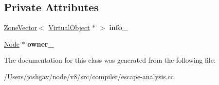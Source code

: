 \subsection*{Private Attributes}
\begin{DoxyCompactItemize}
\item 
\hyperlink{classv8_1_1internal_1_1_zone_vector}{Zone\+Vector}$<$ \hyperlink{classv8_1_1internal_1_1compiler_1_1_virtual_object}{Virtual\+Object} $\ast$ $>$ {\bfseries info\+\_\+}\hypertarget{classv8_1_1internal_1_1compiler_1_1_virtual_state_a58dbd58f14932ccfd8983ab15384cf06}{}\label{classv8_1_1internal_1_1compiler_1_1_virtual_state_a58dbd58f14932ccfd8983ab15384cf06}

\item 
\hyperlink{classv8_1_1internal_1_1compiler_1_1_node}{Node} $\ast$ {\bfseries owner\+\_\+}\hypertarget{classv8_1_1internal_1_1compiler_1_1_virtual_state_abf3ccce504cec6b913ee3abd6ce9ee76}{}\label{classv8_1_1internal_1_1compiler_1_1_virtual_state_abf3ccce504cec6b913ee3abd6ce9ee76}

\end{DoxyCompactItemize}


The documentation for this class was generated from the following file\+:\begin{DoxyCompactItemize}
\item 
/\+Users/joshgav/node/v8/src/compiler/escape-\/analysis.\+cc\end{DoxyCompactItemize}
